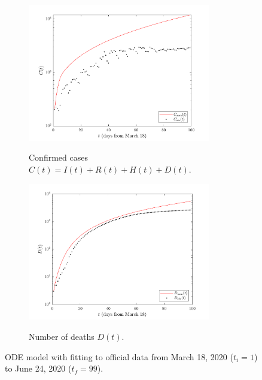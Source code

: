 \documentclass[11pt]{article}
\begin{document}
	\begin{figure}[h!]
		\centering
		\begin{subfigure}{0.5\textwidth}
			\centering
			\includegraphics[height=6cm]{cases}
			\label{fig:ode-cases}
			\caption{Confirmed cases $C(t) = I(t) + R(t) + H(t) + D(t)$.}
		\end{subfigure}%
		\begin{subfigure}{0.5\textwidth}
			\centering
			\includegraphics[height=6cm]{deaths}
			\label{fig:ode-deaths}
			\caption{Number of deaths $D(t)$.}
		\end{subfigure}
		\caption{ODE model with fitting to official data from March 18, 2020 ($t_i = 1$) to June 24, 2020 ($t_f = 99$).}
		\label{fig:ode-results}
	\end{figure}
\end{document}
